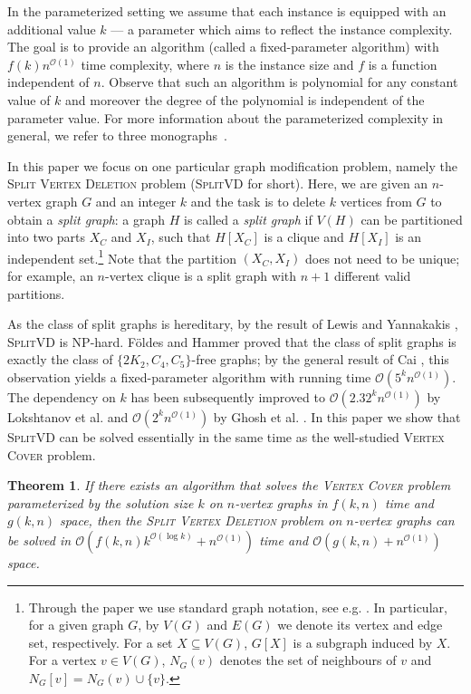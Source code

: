 \documentclass{article}
\newcommand{\Oh}{\ensuremath{\mathcal{O}}}
\newcommand{\splitlong}{\textsc{Split Vertex Deletion}\xspace}
\newcommand{\splitvd}{\textsc{SplitVD}\xspace}
\newcommand{\vertexcover}{\textsc{Vertex Cover}\xspace}
\newtheorem{theorem}{Theorem}[section]
\theoremstyle{definition}
\begin{document}
In the parameterized setting we assume that each instance is equipped with 
an additional value $k$ --- a parameter which aims to reflect
the instance complexity.
The goal is to provide an algorithm (called a fixed-parameter algorithm) with $f(k)n^{\Oh(1)}$
time complexity, where $n$ is the instance size and $f$
is a function independent of $n$.
Observe that such an algorithm is polynomial for any constant value of $k$
and moreover the degree of the polynomial is independent of the parameter value.
For more information about the parameterized complexity in general,
we refer to three monographs~\cite{downey-fellows:book, grohe:book, niedermeier:book}.

In this paper we focus on one particular graph modification problem, namely
the \splitlong problem (\splitvd for short). Here, we are given an $n$-vertex graph
$G$ and an integer $k$ and the task is to delete $k$ vertices from $G$
to obtain a {\em{split graph}}: a graph $H$ is called a {\em{split graph}}
if $V(H)$ can be partitioned into two parts $X_C$ and $X_I$, such that $H[X_C]$
is a clique and $H[X_I]$ is an independent set.\footnote{Through the paper
  we use standard graph notation, see e.g. \cite{diestel}.
  In particular, for a given graph $G$, by $V(G)$ and $E(G)$ we denote
  its vertex and edge set, respectively. For a set $X \subseteq V(G)$,
  $G[X]$ is a subgraph induced by $X$. For a vertex $v \in V(G)$, $N_G(v)$ denotes the set of
  neighbours of $v$ and $N_G[v] = N_G(v) \cup \{v\}$.}
Note that the partition $(X_C,X_I)$ does not need to be unique; for example,
an $n$-vertex clique is a split graph with $n+1$ different valid partitions.

As the class of split graphs is hereditary, by the result of Lewis and Yannakakis \cite{lewis-yannakakis}, \splitvd is NP-hard.
F\"{o}ldes and Hammer \cite{hammer} proved that the class of split graphs
is exactly the class of $\{2K_2,C_4,C_5\}$-free graphs; by the general
result of Cai \cite{cai:vd}, this observation yields a fixed-parameter
algorithm with running time $\Oh(5^k n^{\Oh(1)})$.
The dependency on $k$ has been subsequently improved
to $\Oh(2.32^k n^{\Oh(1)})$ by Lokshtanov et al. \cite{saket:lp}
and $\Oh(2^k n^{\Oh(1)})$ by Ghosh et al. \cite{ashutosh}.
In this paper we show that \splitvd can be solved essentially
in the same time as the well-studied \vertexcover problem.

\begin{theorem}\label{thm:alg}
If there exists an algorithm that solves the \vertexcover problem parameterized
by the solution size $k$ on $n$-vertex graphs in $f(k,n)$ time and $g(k,n)$ space,
then the \splitlong problem on $n$-vertex graphs can be solved
in $\Oh(f(k,n) k^{\Oh(\log k)} + n^{\Oh(1)})$ time and $\Oh(g(k,n) + n^{\Oh(1)})$ space.
\end{theorem}
\end{document}
